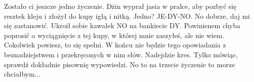 \begin{dialogue}
	\ds{} Zostało ci jeszcze jedno życzenie. \dm{} Dżin wyprał jasia w pralce, aby pozbyć się resztek kleju i złożył do kupy igłą i nitką.
	\ds{} Jedno?
	\ds{} JE-DY-NO.
	\ds{} No dobrze, daj mi się zastanowić. \dm{} Ukroił sobie kawałek NO na bankiecie DY. \dm{} Powinienem chyba poprosić o wyciągnięcie z tej kupy, w której mnie zaszyłeś, ale nie wiem.
	\ds{} Cokolwiek powiesz, to się spełni. W końcu nie będzie tego opowiadania z beznadziejstwem i przekręconych w nim słów. Nadejdzie kres. Tylko mówiąc, sprawdź dokładnie pisownię wypowiedzi.
	\ds{} No to na trzecie życzenie to morze chciałbym...
\end{dialogue}









